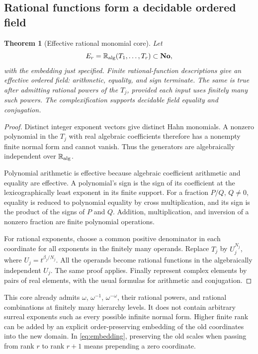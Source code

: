 \documentclass[11pt,letterpaper]{article}
\numberwithin{equation}{section}
\newtheorem{theorem}{Theorem}[section]
\theoremstyle{definition}
\theoremstyle{remark}\newtheorem{remark}[theorem]{Remark}
\newcommand{\No}{\mathbf{No}}
\newcommand{\RA}{\mathbb R_{\rm alg}}
\begin{document}
\subsection{Rational functions form a decidable ordered field}
\begin{theorem}[Effective rational monomial core]\label{thm:rationalcore}
Let
\[
 E_r=\RA(T_1,\ldots,T_r)\subset\No,
\]
with the embedding just specified. Finite rational-function descriptions give
an effective ordered field: arithmetic, equality, and sign terminate. The
same is true after admitting rational powers of the $T_j$, provided each
input uses finitely many such powers. The complexification supports decidable
field equality and conjugation.
\end{theorem}
\begin{proof}
Distinct integer exponent vectors give distinct Hahn monomials. A nonzero
polynomial in the $T_j$ with real algebraic coefficients therefore has a
nonempty finite normal form and cannot vanish. Thus the generators are
algebraically independent over $\RA$.

Polynomial arithmetic is effective because algebraic coefficient arithmetic
and equality are effective. A polynomial's sign is the sign of its coefficient
at the lexicographically least exponent in its finite support. For a fraction
$P/Q$, $Q\ne0$, equality is reduced to polynomial equality by cross
multiplication, and its sign is the product of the signs of $P$ and $Q$.
Addition, multiplication, and inversion of a nonzero fraction are finite
polynomial operations.

For rational exponents, choose a common positive denominator in each
coordinate for all exponents in the finitely many operands. Replace $T_j$
by $U_j^{N_j}$, where $U_j=t^{\beta_j/N_j}$. All the operands become rational
functions in the algebraically independent $U_j$. The same proof applies.
Finally represent complex elements by pairs of real elements, with the usual
formulas for arithmetic and conjugation.
\end{proof}
This core already admits $\omega$, $\omega^{-1}$,
$\omega^{-\omega}$, their rational powers, and rational combinations at
finitely many hierarchy levels. It does not contain arbitrary surreal
exponents such as every possible infinite normal form. Higher finite rank
can be added by an explicit order-preserving embedding of the old coordinates
into the new domain. In \eqref{eq:embedding}, preserving the old scales when
passing from rank $r$ to rank $r+1$ means prepending a zero coordinate.
\end{document}
